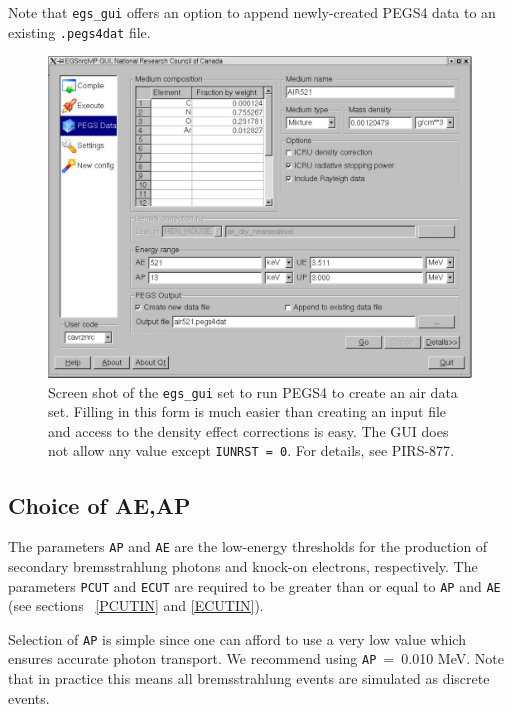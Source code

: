 \documentclass[12pt,twoside]{article}
\begin{document}
Note that {\tt egs\_gui} offers an option to append newly-created
PEGS4 data to an existing {\tt .pegs4dat} file.

\clearpage

\begin{figure}[ht]
   \leavevmode
   \begin{center}
   \includegraphics[width=12cm]{figures/egs_gui_pegs4_screen}
    \end{center}
   \caption{Screen shot of the {\tt egs\_gui} set to run PEGS4 to create
an air data set. Filling in this form is much easier than creating an input
file and access to the density effect corrections is easy. The GUI
does not allow any value except {\tt IUNRST = 0}. For details, see
PIRS-877\cite{Ka03}. }
   \label{fig_pegs4_screen}
\end{figure}

\subsection{Choice of AE,AP}
 
\label{AE}
  

The parameters  \verb+AP+ and  \verb+AE+ are the low-energy thresholds
for the production of secondary bremsstrahlung photons and knock-on
electrons, respectively.  The parameters \verb+PCUT+ and \verb+ECUT+ are
required to be greater than or equal to \verb+AP+ and  \verb+AE+ (see
sections ~\ref{PCUTIN} and \ref{ECUTIN}).

Selection of \verb+AP+ is simple since one can afford to use a very low
value which ensures accurate photon transport.  We recommend using
\verb+AP+~=~0.010 MeV.  Note that in practice this means all
bremsstrahlung events are simulated as discrete events.
\end{document}
